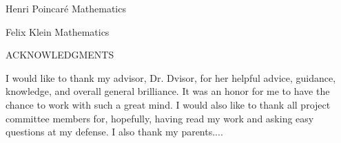 \documentclass[12pt,leqno]{article}
\theoremstyle{remark}
\begin{document}

\vskip 0.3in
\begin{center}
 \makebox[\textwidth]{\hspace{2pc}\hrulefill\hspace{2pc}}
 \end{center}
 \vskip -0.2in
 \hspace{2pc}%
Henri Poincar\'e \hfill Mathematics  \hspace{2pc}

\vskip 0.3in
\begin{center}
\makebox[\textwidth]{\hspace{2pc}\hrulefill\hspace{2pc}}
\end{center}
\vskip -0.2in
\hspace{2pc}%
Felix Klein \hfill Mathematics \hspace{2pc}   %

\thispagestyle{empty}
\newpage

\begin{center}
ACKNOWLEDGMENTS
\end{center}
\doublespacing

I would like to thank my advisor, Dr. Dvisor, for her helpful advice, guidance, knowledge, and overall general brilliance. It was an honor for me to have the chance to work with such a great mind. I would also like to thank all project committee members for, hopefully, having read my work and asking easy questions at my defense. I  also thank my parents....
\newline\newline\newline

\singlespacing
\thispagestyle{empty}
\newpage


\begin{center}
\tableofcontents
\end{center}
\thispagestyle{empty}
\newpage
\end{document}
